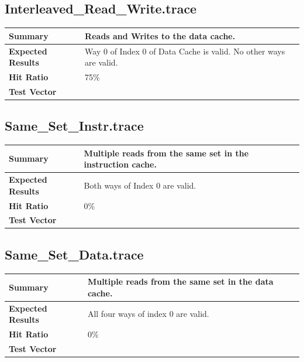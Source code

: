 \documentclass{article}
\begin{document}
\subsection{Interleaved\_Read\_Write.trace}
\begin{tabular}{|p{1.2in}|p{3.8in}|}
  \hline
  \textbf{Summary} & Reads and Writes to the data cache.\\
  \hline
  \textbf{Expected Results} & Way 0 of Index 0 of Data Cache is valid. No other
ways are valid.\\
  \hline
  \textbf{Hit Ratio} & 75\%\\
  \hline
  \textbf{Test Vector} &  \\
  \hline
\end{tabular}

\subsection{Same\_Set\_Instr.trace}
\begin{tabular}{|p{1.2in}|p{3.8in}|}
  \hline
  \textbf{Summary} & Multiple reads from the same set in the instruction cache.\\
  \hline
  \textbf{Expected Results} & Both ways of Index 0 are valid.\\
  \hline
  \textbf{Hit Ratio} & 0\%\\
  \hline
  \textbf{Test Vector} &  \\
  \hline
\end{tabular}

\subsection{Same\_Set\_Data.trace}
\begin{tabular}{|p{1.2in}|p{3.8in}|}
  \hline
  \textbf{Summary} & Multiple reads from the same set in the data cache. \\
  \hline
  \textbf{Expected Results} & All four ways of index 0 are valid.\\
  \hline
  \textbf{Hit Ratio} & 0\%\\
  \hline
  \textbf{Test Vector} &  \\
  \hline
\end{tabular}
\end{document}
